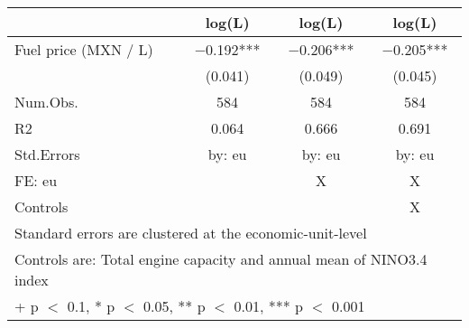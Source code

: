 \begin{table}[H]
\centering
\begin{tabular}[t]{lccc}
\toprule
  & log(L) & log(L)  & log(L)  \\
\midrule
Fuel price (MXN / L) & \num{-0.192}*** & \num{-0.206}*** & \num{-0.205}***\\
 & (\num{0.041}) & (\num{0.049}) & (\num{0.045})\\
\midrule
Num.Obs. & \num{584} & \num{584} & \num{584}\\
R2 & \num{0.064} & \num{0.666} & \num{0.691}\\
Std.Errors & by: eu & by: eu & by: eu\\
FE: eu &  & X & X\\
Controls &  &  & X\\
\bottomrule
\multicolumn{4}{l}{\rule{0pt}{1em}Standard errors are clustered at the economic-unit-level}\\
\multicolumn{4}{l}{\rule{0pt}{1em}Controls are: Total engine capacity and annual mean of NINO3.4 index}\\
\multicolumn{4}{l}{\rule{0pt}{1em}+ p $<$ 0.1, * p $<$ 0.05, ** p $<$ 0.01, *** p $<$ 0.001}\\
\end{tabular}
\end{table}
